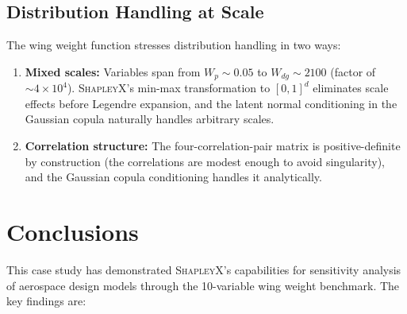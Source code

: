 \documentclass[11pt,a4paper]{article}
\begin{document}
\subsection{Distribution Handling at Scale}

The wing weight function stresses distribution handling in two ways:

\begin{enumerate}[nosep]
    \item \textbf{Mixed scales:} Variables span from $W_p \sim 0.05$ to $W_{dg} \sim 2100$ (factor of $\sim 4 \times 10^4$). \textsc{ShapleyX}'s min-max transformation to $[0,1]^d$ eliminates scale effects before Legendre expansion, and the latent normal conditioning in the Gaussian copula naturally handles arbitrary scales.
    \item \textbf{Correlation structure:} The four-correlation-pair matrix is positive-definite by construction (the correlations are modest enough to avoid singularity), and the Gaussian copula conditioning handles it analytically.
\end{enumerate}

\section{Conclusions}

This case study has demonstrated \textsc{ShapleyX}'s capabilities for sensitivity analysis of aerospace design models through the 10-variable wing weight benchmark. The key findings are:
\end{document}
